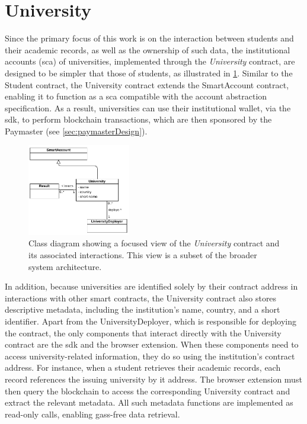 \section{University}
Since the primary focus of this work is on the interaction between students and their academic records, as well as the ownership of such data, the institutional accounts (\acrlong{sca}) of universities, implemented through the \textit{University} contract, are designed to be simpler that those of students, as illustrated in \cref{fig:universityContractClass}. Similar to the Student contract, the University contract extends the SmartAccount contract, enabling it to function as a \acrshort{sca} compatible with the account abstraction specification. As a result, universities can use their institutional wallet, via the \acrshort{sdk}, to perform blockchain transactions, which are then sponsored by the Paymaster (see \cref{sec:paymasterDesign}). 
\begin{figure}
  \centering
  \includegraphics[width=0.4\textwidth]{figures/University class diagram.pdf}
  \caption[Class diagram focused on \textit{University} contract]{Class diagram showing a focused view of the \textit{University} contract and its associated interactions. This view is a subset of the broader system architecture.}
  \label{fig:universityContractClass}
\end{figure}

In addition, because universities are identified solely by their contract address in interactions with other smart contracts, the University contract also stores descriptive metadata, including the institution's name, country, and a short identifier. Apart from the UniversityDeployer, which is responsible for deploying the contract, the only components that interact directly with the University contract are the \acrshort{sdk} and the browser extension. When these components need to access university-related information, they do so using the institution's contract address. For instance, when a student retrieves their academic records, each record references the issuing university by it address. The browser extension must then query the blockchain to access the corresponding University contract and extract the relevant metadata. All such metadata functions are implemented as read-only calls, enabling gass-free data retrieval.   

